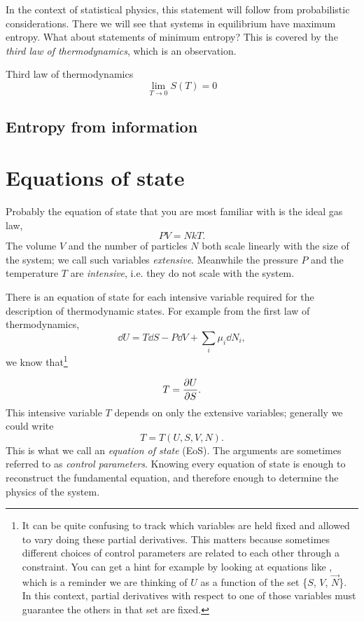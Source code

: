 In the context of statistical physics, this statement will follow from
probabilistic considerations. There we will see that systems in equilibrium have
maximum entropy. What about statements of minimum entropy? This is covered by
the {\it third law of thermodynamics}, which is an observation.
\begin{theorem}{Third law of thermodynamics}{}
$$
  \lim_{T\to0}S(T)=0
$$
\end{theorem}


\subsection{Entropy from information}

\section{Equations of state}\label{sec:EoS}


Probably the equation of state that you are most familiar with is the 
ideal gas law,
\begin{equation}
  PV=NkT.
\end{equation}
The volume $V$ and the number of particles $N$ both scale linearly with the
size of the system; we call such variables {\it extensive}. 
Meanwhile the pressure $P$ and the temperature $T$ are {\it intensive}, 
i.e. they do not scale with the system.

There is an equation of state for each intensive variable required for the
description of thermodynamic states. For example from the
first law of thermodynamics,
\begin{equation}\label{eq:fslaw}
  \dd{U}=T\dd{S}-P\dd{V}+\sum_i\mu_i\dd{N}_i,
\end{equation}
we know that\footnote{It can be quite confusing to track which variables
are held fixed and allowed to vary doing these partial derivatives.
This matters because sometimes different choices of control parameters
are related to each other through a constraint.
You can get a hint for example by looking at equations like
, which is a reminder we are thinking of
$U$ as a function of the set \{$S$, $V$, $\vec{N}$\}. In this context,
partial derivatives with respect to one of those variables must
guarantee the others in that set are fixed.}

\begin{equation}
  T=\pdv{U}{S}.
\end{equation}
This intensive variable $T$ depends on only the extensive variables; 
generally we could write
\begin{equation}
  T=T(U,S,V,N).
\end{equation}
This is what we call an {\it equation of state}
(EoS). The arguments are sometimes referred to as 
{\it control parameters}. Knowing every equation 
of state is enough to reconstruct the fundamental equation, and therefore 
enough to determine the physics of the system.

